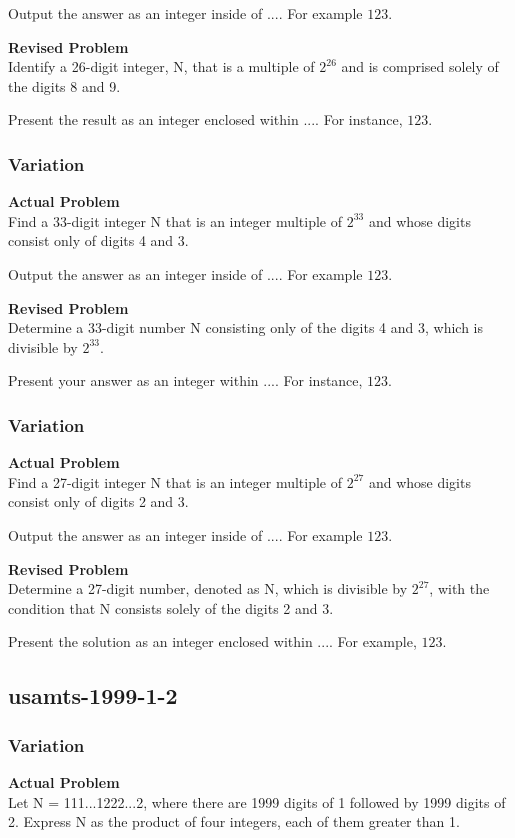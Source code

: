 Output the answer as an integer inside of $\boxed{...}$. For example $\boxed{123}$.

\textbf{Revised Problem}\\
Identify a 26-digit integer, N, that is a multiple of \(2^{26}\) and is comprised solely of the digits 8 and 9.

Present the result as an integer enclosed within $\boxed{...}$. For instance, $\boxed{123}$.

\subsubsection{Variation}
\textbf{Actual Problem}\\
Find a 33-digit integer N that is an integer multiple of $2^{ 33 }$ and whose digits consist only of digits 4 and 3.

Output the answer as an integer inside of $\boxed{...}$. For example $\boxed{123}$.

\textbf{Revised Problem}\\
Determine a 33-digit number N consisting only of the digits 4 and 3, which is divisible by \( 2^{33} \).

Present your answer as an integer within $\boxed{...}$. For instance, $\boxed{123}$.

\subsubsection{Variation}
\textbf{Actual Problem}\\
Find a 27-digit integer N that is an integer multiple of $2^{ 27 }$ and whose digits consist only of digits 2 and 3.

Output the answer as an integer inside of $\boxed{...}$. For example $\boxed{123}$.

\textbf{Revised Problem}\\
Determine a 27-digit number, denoted as N, which is divisible by \(2^{27}\), with the condition that N consists solely of the digits 2 and 3.

Present the solution as an integer enclosed within \(\boxed{...}\). For example, \(\boxed{123}\).

\subsection{usamts-1999-1-2}
\subsubsection{Variation}
\textbf{Actual Problem}\\
Let N = 111...1222...2, where there are 1999 digits of 1 followed by 1999 digits of 2.
Express N as the product of four integers, each of them greater than 1.

